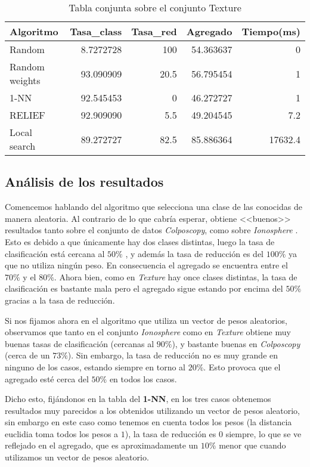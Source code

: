 \documentclass[size=a4, parskip=half, titlepage=false, toc=flat, toc=bib, 12pt]{scrartcl}
\begin{document}
 \begin{table}[ht]
  \centering
  \begin{tabular}[t]{lrrrr}
  \toprule
  Algoritmo &Tasa\_class &Tasa\_red & Agregado & Tiempo(ms)\\
  \midrule
 Random             & 8.7272728 & 100 & 54.363637 & 0\\
 Random weights     & 93.090909 & 20.5 & 56.795454 & 1\\
 1-NN               & 92.545453 & 0 & 46.272727 & 1\\
 RELIEF             & 92.909090 & 5.5 & 49.204545 & 7.2\\
 Local search       & 89.272727 & 82.5 & 85.886364 & 17632.4\\
\bottomrule
  \end{tabular}
  \caption{Tabla conjunta sobre el conjunto Texture}
  \end{table}%

\newpage

\subsection{Análisis de los resultados}

Comencemos hablando del algoritmo que selecciona una clase de las conocidas de manera aleatoria. Al contrario de lo que cabría esperar, obtiene <<buenos>> resultados tanto sobre el conjunto de datos \textit{Colposcopy}, como sobre \textit{Ionosphere} . Esto es debido a que únicamente hay dos clases distintas, luego la tasa de clasificación está cercana al $50\%$ , y además la tasa de reducción es del $100\%$ ya que no utiliza ningún peso. En consecuencia el agregado se encuentra entre el $70\%$ y el $80\%$. Ahora bien, como en \textit{Texture} hay once clases distintas, la tasa de clasificación es bastante mala pero el agregado sigue estando por encima del $50\%$ gracias a la tasa de reducción.

Si nos fijamos ahora en el algoritmo que utiliza un vector de pesos aleatorios, observamos que tanto en el conjunto \textit{Ionosphere} como en \textit{Texture} obtiene muy buenas tasas de clasificación (cercanas al $90\%$), y bastante buenas en \textit{Colposcopy} (cerca de un $73\%$). Sin embargo, la tasa de reducción no es muy grande en ninguno de los casos, estando siempre en torno al $20\%$. Esto provoca que el agregado esté cerca del $50\%$ en todos los casos.

Dicho esto, fijándonos en la tabla del \textbf{1-NN}, en los tres casos obtenemos resultados muy parecidos a los obtenidos utilizando un vector de pesos aleatorio, sin embargo en este caso como tenemos en cuenta todos los pesos (la distancia euclidia toma todos los pesos a $1$), la tasa de reducción es $0$ siempre, lo que se ve reflejado en el agregado, que es aproximadamente un $10\%$ menor que cuando utilizamos un vector de pesos aleatorio.
\end{document}
